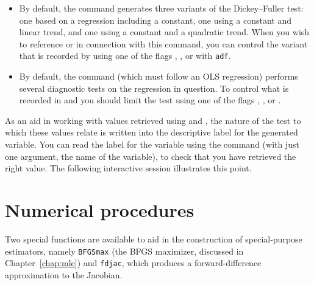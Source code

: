 \begin{itemize}
\item By default, the  command generates three variants of
  the Dickey--Fuller test: one based on a regression including a
  constant, one using a constant and linear trend, and one using a
  constant and a quadratic trend.  When you wish to reference
   or  in connection with this command, you
  can control the variant that is recorded by using one of the flags
  , ,  or  with
  \verb+adf+.
\item By default, the  command (which must follow an OLS
  regression) performs several diagnostic tests on the regression in
  question.  To control what is recorded in  and
   you should limit the test using one of the flags
  , ,  or
  .
\end{itemize}

As an aid in working with values retrieved using  and
, the nature of the test to which these values relate is
written into the descriptive label for the generated variable.  You
can read the label for the variable using the  command
(with just one argument, the name of the variable), to check that you
have retrieved the right value.  The following interactive session
illustrates this point.


\section{Numerical procedures}
\label{sec:genr-numerical}

Two special functions are available to aid in the construction of
special-purpose estimators, namely \texttt{BFGSmax} (the BFGS
maximizer, discussed in Chapter~\ref{chap:mle}) and \texttt{fdjac},
which produces a forward-difference approximation to the Jacobian.

